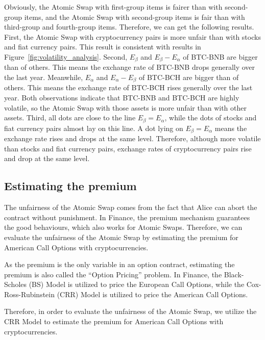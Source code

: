 Obviously, the Atomic Swap with first-group items is fairer than with second-group items, and the Atomic Swap with second-group items is fair than with third-group and fourth-group items.
Therefore, we can get the following results.
First, the Atomic Swap with cryptocurrency pairs is more unfair than with stocks and fiat currency pairs. This result is consistent with results in Figure~\ref{fig:volatility_analysis}.
Second, $E_\beta$ and $E_\beta - E_\alpha$ of BTC-BNB are bigger than of others. This means the exchange rate of BTC-BNB drops generally over the last year.
Meanwhile, $E_\alpha$ and $E_\alpha - E_\beta$ of BTC-BCH are bigger than of others. This means the exchange rate of BTC-BCH rises generally over the last year.
Both observations indicate that BTC-BNB and BTC-BCH are highly volatile, so the Atomic Swap with those assets is more unfair than with other assets.
Third, all dots are close to the line $E_\beta = E_\alpha$, while the dots of stocks and fiat currency pairs almost lay on this line.
A dot lying on $E_\beta = E_\alpha$ means the exchange rate rises and drops at the same level.
Therefore, although more volatile than stocks and fiat currency pairs, exchange rates of cryptocurrency pairs rise and drop at the same level.
















\subsection{Estimating the premium}

The unfairness of the Atomic Swap comes from the fact that Alice can abort the contract without punishment.
In Finance, the premium mechanism guarantees the good behaviours, which also works for Atomic Swaps.
Therefore, we can evaluate the unfairness of the Atomic Swap by estimating the premium for American Call Options with cryptocurrencies.

As the premium is the only variable in an option contract, estimating the premium is also called the ``Option Pricing'' problem.
In Finance, the Black-Scholes (BS) Model is utilized to price the European Call Options,
while the Cox-Ross-Rubinstein (CRR) Model is utilized to price the American Call Options.

Therefore, in order to evaluate the unfairness of the Atomic Swap, we utilize the CRR Model to estimate the premium for American Call Options with cryptocurrencies.

